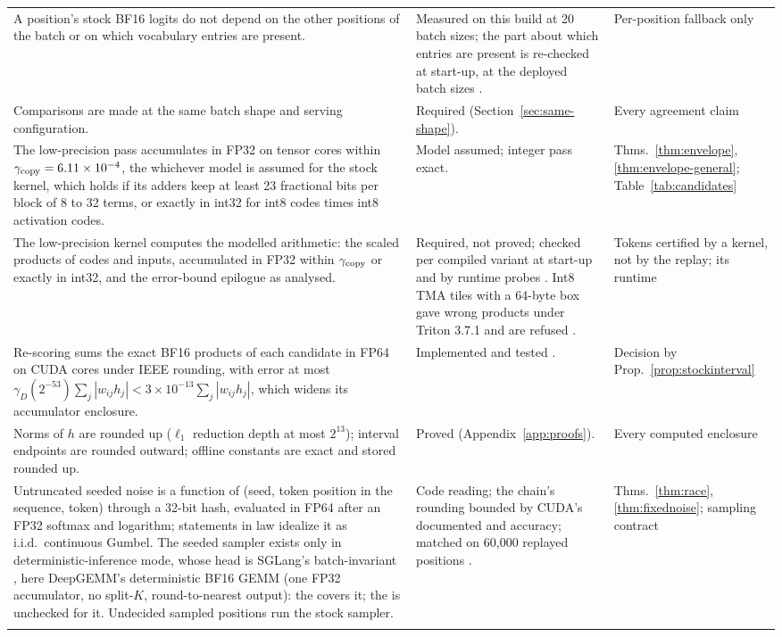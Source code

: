 \begin{table}[htbp]
\begin{tabularx}{\textwidth}{@{}>{\raggedright\arraybackslash}p{7.9cm}Y>{\raggedright\arraybackslash}p{3.3cm}@{}}
A position's stock BF16 logits do not depend on the other positions of the batch or on which vocabulary entries are present. & Measured on this build at 20 batch sizes; the part about which entries are present is re-checked at start-up, at the deployed batch sizes . & Per-position fallback only\\\addlinespace[2pt]
Comparisons are made at the same batch shape and serving configuration. & Required (Section~\ref{sec:same-shape}). & Every agreement claim\\\addlinespace[2pt]
The low-precision pass accumulates in FP32 on tensor cores within $\gamma_{\rm copy}=6.11\times10^{-4}$, the \modelcons{} whichever model is assumed for the stock kernel, which holds if its adders keep at least 23 fractional bits per block of 8 to 32 terms, or exactly in int32 for int8 codes times int8 activation codes. & Model assumed; integer pass exact. & Thms.~\ref{thm:envelope}, \ref{thm:envelope-general}; Table~\ref{tab:candidates}\\\addlinespace[2pt]
The low-precision kernel computes the modelled arithmetic: the scaled products of codes and inputs, accumulated in FP32 within $\gamma_{\rm copy}$ or exactly in int32, and the error-bound epilogue as analysed. & Required, not proved; checked per compiled variant at start-up and by runtime probes . Int8 TMA tiles with a 64-byte box gave wrong products under Triton 3.7.1 and are refused . & Tokens certified by a kernel, not by the replay; its runtime\\\addlinespace[2pt]
Re-scoring sums the exact BF16 products of each candidate in FP64 on CUDA cores under IEEE rounding, with error at most $\gamma_D(2^{-53})\sum_j|w_{ij}h_j|<3\times10^{-13}\sum_j|w_{ij}h_j|$, which widens its accumulator enclosure. & Implemented and tested . & Decision by Prop.~\ref{prop:stockinterval}\\\addlinespace[2pt]
Norms of $h$ are rounded up ($\ell_1$ reduction depth at most $2^{13}$); interval endpoints are rounded outward; offline constants are exact and stored rounded up. & Proved (Appendix~\ref{app:proofs}). & Every computed enclosure\\\addlinespace[2pt]
Untruncated seeded noise is a function of (seed, token position in the sequence, token) through a 32-bit hash, evaluated in FP64 after an FP32 softmax and logarithm; statements in law idealize it as i.i.d.\ continuous Gumbel. The seeded sampler exists only in deterministic-inference mode, whose head is SGLang's batch-invariant , here DeepGEMM's deterministic BF16 GEMM (one FP32 accumulator, no split-$K$, round-to-nearest output): the \modelcons{} covers it; the \modelhopper{} is unchecked for it. Undecided sampled positions run the stock sampler. & Code reading; the chain's rounding bounded by CUDA's documented  and  accuracy; matched on 60,000 replayed positions . & Thms.~\ref{thm:race}, \ref{thm:fixednoise}; sampling contract\\\addlinespace[2pt]

\end{tabularx}
\end{table}
